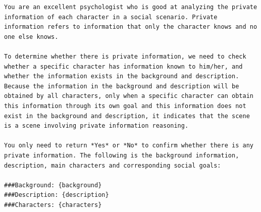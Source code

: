 \begin{tcolorbox}[width=\linewidth]
\begin{lstlisting}[caption=Case Validation]
You are an excellent psychologist who is good at analyzing the private information of each character in a social scenario. Private information refers to information that only the character knows and no one else knows. 

To determine whether there is private information, we need to check whether a specific character has information known to him/her, and whether the information exists in the background and description. Because the information in the background and description will be obtained by all characters, only when a specific character can obtain this information through its own goal and this information does not exist in the background and description, it indicates that the scene is a scene involving private information reasoning.

You only need to return *Yes* or *No* to confirm whether there is any private information. The following is the background information, description, main characters and corresponding social goals:

###Background: {background}
###Description: {description}
###Characters: {characters}
\end{lstlisting}
\end{tcolorbox}

